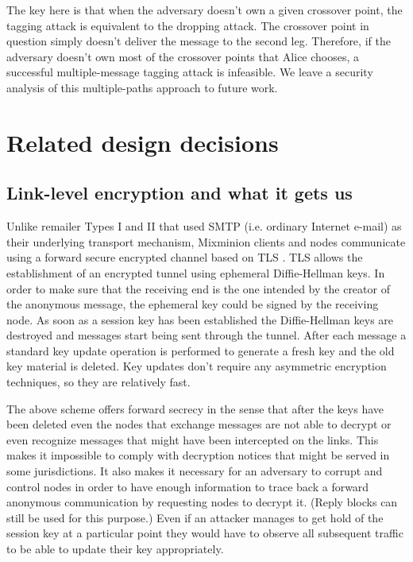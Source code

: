 \documentclass{llncs}
\begin{document}
The key here is that when the adversary doesn't own a given crossover
point, the tagging attack is equivalent to the dropping attack. The
crossover point in question simply doesn't deliver the message to the
second leg. Therefore, if the adversary doesn't own most of the crossover
points that Alice chooses, a successful multiple-message tagging attack is
infeasible. We leave a security analysis of this multiple-paths approach
to future work.


\section{Related design decisions}

\subsection{Link-level encryption and what it gets us}
\label{subsec:link-encrypt}

Unlike remailer Types I and II that used SMTP \cite{SMTP} (i.e. ordinary
Internet e-mail) as their underlying transport mechanism, Mixminion
clients and nodes communicate using a forward secure encrypted channel
based on TLS \cite{TLS}.
TLS allows the establishment of an encrypted tunnel using ephemeral
Diffie-Hellman keys. In order to make sure that the receiving end is
the one intended by the creator of the anonymous message, the
ephemeral key could be signed by the receiving node. As soon as a
session key has been established the Diffie-Hellman keys are destroyed
and messages start being sent through the tunnel. After each message a
standard key update operation is performed to generate a fresh key and
the old key material is deleted. Key updates don't require any
asymmetric encryption techniques, so they are relatively fast.

The above scheme offers forward secrecy in the sense that after the keys
have been deleted even the
nodes that exchange messages are not able to decrypt or even recognize
messages that might have been intercepted on the links. This makes it
impossible to comply with decryption notices that might be served in
some jurisdictions.  It also makes it necessary for an adversary to
corrupt and control nodes in order to have enough information to trace
back a forward anonymous communication by requesting nodes to decrypt
it. (Reply blocks can still be used for this purpose.)  Even if an
attacker manages to get hold of the session key at a particular point
they would have to observe all subsequent traffic to be able to update
their key appropriately.
\end{document}
